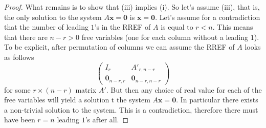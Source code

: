 \documentclass[10pt, a4paper]{article}
\newcommand{\mbf}[1]{\mathbf{#1}}
\begin{document}
\begin{lemma}
\begin{proof}
        What remains is to show that (iii) implies (i).
        So let's assume (iii), that is,
        the only solution to the system $A\mbf{x} = \mbf{0}$ is $\mbf{x} = \mbf{0}$.
        Let's assume for a contradiction that the number of leading $1$'s in the RREF of $A$ is equal to $r < n$.
        This means that there are $n - r > 0$ free variables (one for each column without a leading $1$).
        To be explicit, after permutation of columns we can assume the RREF of $A$ looks as follows
        \[
        \begin{pmatrix}
            I_r & A'_{r, n - r} \\
            \mbf{0}_{n - r, r} & \mbf{0}_{n - r, n - r}
        \end{pmatrix}
        \]
        for some $r \times (n - r)$ matrix $A'$.
        But then any choice of real value for each of the free variables will yield a solution t the system $A\mbf{x} = \mbf{0}$.
        In particular there exists a non-trivial solution to the system.
        This is a contradiction, therefore there must have been $r = n$ leading $1$'s after all.
    \end{proof}
\end{lemma}
\end{document}

